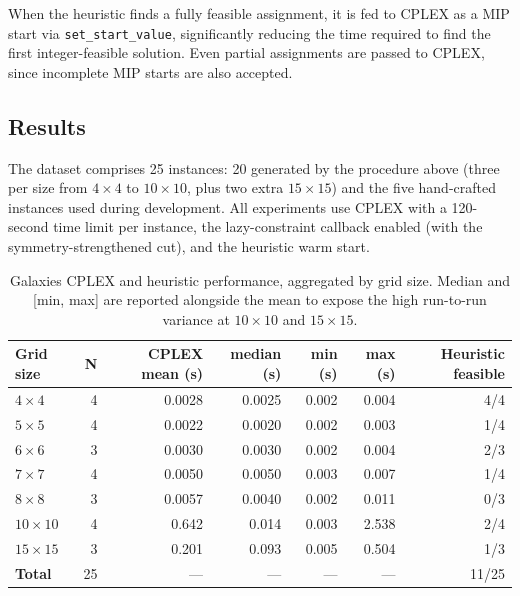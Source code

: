 When the heuristic finds a fully feasible assignment, it is fed to CPLEX as a MIP start via \texttt{set\_start\_value}, significantly reducing the time required to find the first integer-feasible solution. Even partial assignments are passed to CPLEX, since incomplete MIP starts are also accepted.

\subsection{Results}

The dataset comprises 25 instances: 20 generated by the procedure above (three per size from $4{\times}4$ to $10{\times}10$, plus two extra $15{\times}15$) and the five hand-crafted instances used during development. All experiments use CPLEX with a 120-second time limit per instance, the lazy-constraint callback enabled (with the symmetry-strengthened cut), and the heuristic warm start.

\begin{table}[H]
\centering
\caption{Galaxies CPLEX and heuristic performance, aggregated by grid size. Median and [min, max] are reported alongside the mean to expose the high run-to-run variance at $10 \times 10$ and $15 \times 15$.}
\label{tab:galaxies-summary}
\begin{tabular}{lrrrrrr}
\toprule
Grid size & N & CPLEX mean (s) & median (s) & min (s) & max (s) & Heuristic feasible \\
\midrule
$4 \times 4$   & 4 & 0.0028 & 0.0025 & 0.002 & 0.004 & 4/4 \\
$5 \times 5$   & 4 & 0.0022 & 0.0020 & 0.002 & 0.003 & 1/4 \\
$6 \times 6$   & 3 & 0.0030 & 0.0030 & 0.002 & 0.004 & 2/3 \\
$7 \times 7$   & 4 & 0.0050 & 0.0050 & 0.003 & 0.007 & 1/4 \\
$8 \times 8$   & 3 & 0.0057 & 0.0040 & 0.002 & 0.011 & 0/3 \\
$10 \times 10$ & 4 & 0.642  & 0.014  & 0.003 & 2.538 & 2/4 \\
$15 \times 15$ & 3 & 0.201  & 0.093  & 0.005 & 0.504 & 1/3 \\
\midrule
\textbf{Total} & 25 & --- & --- & --- & --- & 11/25 \\
\bottomrule
\end{tabular}
\end{table}

